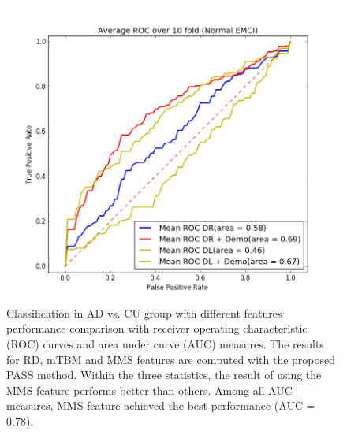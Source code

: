 \begin{figure}
	\centering
	\includegraphics[width=\linewidth]{figures/CU_EMCI}
	\caption[ROC for Normal vs. EMCI]{Classification in AD vs. CU group with different features performance comparison with receiver operating characteristic (ROC) curves and area under curve (AUC) measures. The results for RD, mTBM and MMS features are computed with the proposed PASS method. Within the three statistics, the result of using the MMS feature performs better than others. Among all AUC measures, MMS feature achieved the best performance (AUC = 0.78).}
	\label{fig:cuemci}
\end{figure}
